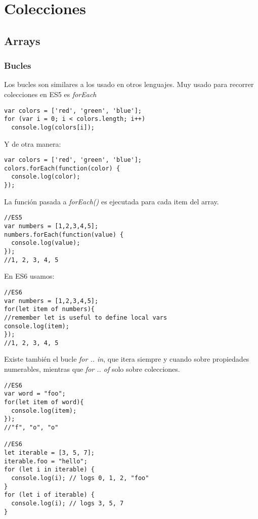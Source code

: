 \documentclass[4paper]{article}
\begin{document}
\newpage
\section{Colecciones}
\subsection{Arrays}

\subsubsection{Bucles}
Los bucles son similares a los usado en otros lenguajes. Muy usado para recorrer colecciones en ES5 es \emph{forEach}

\begin{lstlisting}
var colors = ['red', 'green', 'blue'];
for (var i = 0; i < colors.length; i++) 
  console.log(colors[i]);
\end{lstlisting}
Y de otra manera:
\begin{lstlisting}
var colors = ['red', 'green', 'blue'];
colors.forEach(function(color) {
  console.log(color);
});
\end{lstlisting}
La función pasada a \emph{forEach()} es ejecutada para cada item del array.

\begin{lstlisting}
//ES5
var numbers = [1,2,3,4,5];
numbers.forEach(function(value) {
  console.log(value);
});
//1, 2, 3, 4, 5
\end{lstlisting}
En ES6 usamos:
\begin{lstlisting}
//ES6
var numbers = [1,2,3,4,5];
for(let item of numbers){
//remember let is useful to define local vars
console.log(item);
});
//1, 2, 3, 4, 5
\end{lstlisting}
Existe también el bucle \emph{for .. in}, que itera siempre y cuando sobre propiedades numerables, mientras que \emph{for .. of} solo sobre colecciones.
\begin{lstlisting}
//ES6
var word = "foo";
for(let item of word){
  console.log(item);
});
//"f", "o", "o"

//ES6
let iterable = [3, 5, 7];
iterable.foo = "hello";
for (let i in iterable) {
  console.log(i); // logs 0, 1, 2, "foo"
}
for (let i of iterable) {
  console.log(i); // logs 3, 5, 7
}
\end{lstlisting}
\end{document}
